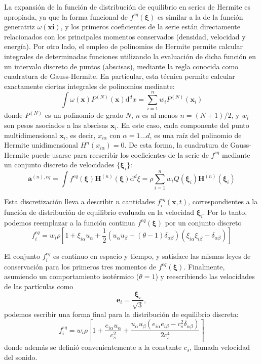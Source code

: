 La expansi\'on de la funci\'on de distribuci\'on de equilibrio \feqvar{} en series de Hermite es apropiada, ya que la forma funcional de $f^{eq}(\bm{\xi})$ es similar a la de la funci\'on generatriz $\omega(\bm{xi})$, y los primeros coeficientes de la serie est\'an directamente relacionados con los principales momentos conservados (densidad, velocidad y energ\'ia). Por otro lado, el empleo de polinomios de Hermite permite calcular integrales de determinadas funciones utilizando la evaluaci\'on de dicha funci\'on en un intervalo discreto de puntos (abscisas), mediante la regla conocida como cuadratura de Gauss-Hermite. En particular, esta t\'ecnica permite calcular exactamente ciertas integrales de polinomios mediante:
\begin{equation}
	\int \omega(\bm{x}) P^{(N)}(\bm{x})\mbox{d}^dx = \sum_{i=1}^{n} w_i P^{(N)}(\bm{x}_i)
\end{equation}
donde $P^{(N)}$ es un polinomio de grado $N$, $n$ es al menos $n=(N+1)/2$, y $w_i$ son pesos asociados a las abscisas $\bm{x}_i$. En este caso, cada componente del punto multidimensional $\bm{x}_i$, es decir, $x_{i\alpha}$ con $\alpha=1\ldots d$, es una ra\'iz del polinomio de Hermite unidimensional $H^{n}(x_{i\alpha})=0$. De esta forma, la cuadratura de Gauss-Hermite puede usarse para reescribir los coeficientes de la serie de $f^{eq}$ mediante un conjunto discreto de velocidades $\{ \bm{\xi}_i \}$:
\begin{equation}
	\bm{a}^{(n),eq} = \int f^{eq}(\bm{\xi}) \bm{H}^{(n)}(\bm{\xi}) \mbox{d}^d \xi 
	= \rho \sum_{i=1}^n w_i Q(\bm{\xi}_i)\bm{H}^{(n)}(\bm{\xi}_i)
\end{equation}

Esta discretizaci\'on lleva a describir $n$ cantidades $f_i^{eq}(\bm{x},t)$, correspondientes a la funci\'on de distribuci\'on de equilibrio evaluada en la velocidad $\bm{\xi}_i$. Por lo tanto, podemos reemplazar a la funci\'on continua $f^{eq}(\bm{\xi})$ por un conjunto discreto
\begin{equation}
	f_i^{eq} = w_i \rho \left[ 1 + \xi_{i\alpha}u_{\alpha} + \dfrac{1}{2}\left( u_{\alpha}u_{\beta}+(\theta-1)\delta_{\alpha\beta} \right)\left(\xi_{i\alpha}\xi_{i\beta} - \delta_{\alpha\beta}\right) \right]
\end{equation}
\par
El conjunto ${f_i^{eq}}$ es continuo en espacio y tiempo, y satisface las mismas leyes de conservaci\'on para los primeros tres momentos de $f^{eq}(\bm{\xi})$. Finalmente, asumiendo un comportamiento isot\'ermico ($\theta = 1$) y reescribiendo las velocidades de las part\'iculas como
\begin{equation}
	\bm{e}_i = \dfrac{\bm{\xi}_i}{\sqrt{3}},
\end{equation}
podemos escribir una forma final para la distribuci\'on de equilibrio discreta:
\begin{equation}
	f_i^{eq} = w_i \rho \left[ 1 + \dfrac{e_{i\alpha}u_{\alpha}}{c_s^2} + \dfrac{u_{\alpha}u_{\beta}(e_{i\alpha}e_{i\beta}-c_s^2\delta_{\alpha\beta})}{2c_s^4} \right]
	\label{eq:feq}
\end{equation}
donde adem\'as se defini\'o convenientemente a la constante $c_s$, llamada velocidad del sonido.


